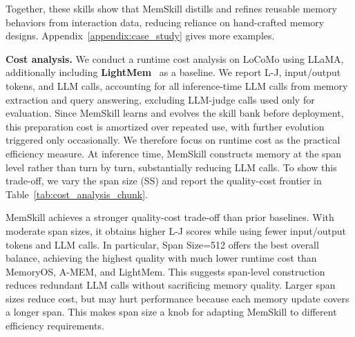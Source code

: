Together, these skills show that MemSkill distills and refines reusable memory behaviors from interaction data, reducing reliance on hand-crafted memory designs. Appendix~\ref{appendix:case_study} gives more examples.






\textbf{Cost analysis.}
We conduct a runtime cost analysis on LoCoMo using LLaMA, additionally including \textbf{LightMem}~\citep{fang2025lightmem} as a baseline. We report L-J, input/output tokens, and LLM calls, accounting for all inference-time LLM calls from memory extraction and query answering, excluding LLM-judge calls used only for evaluation. Since MemSkill learns and evolves the skill bank before deployment, this preparation cost is amortized over repeated use, with further evolution triggered only occasionally. We therefore focus on runtime cost as the practical efficiency measure. At inference time, MemSkill constructs memory at the span level rather than turn by turn, substantially reducing LLM calls. To show this trade-off, we vary the span size (SS) and report the quality-cost frontier in Table~\ref{tab:cost_analysis_chunk}.








MemSkill achieves a stronger quality-cost trade-off than prior baselines. With moderate span sizes, it obtains higher L-J scores while using fewer input/output tokens and LLM calls. In particular, Span Size=512 offers the best overall balance, achieving the highest quality with much lower runtime cost than MemoryOS, A-MEM, and LightMem. This suggests span-level construction reduces redundant LLM calls without sacrificing memory quality. Larger span sizes reduce cost, but may hurt performance because each memory update covers a longer span. This makes span size a knob for adapting MemSkill to different efficiency requirements.





